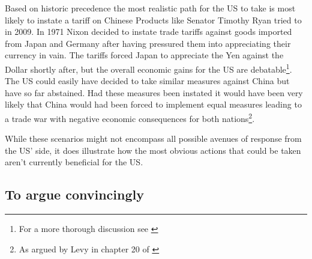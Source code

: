 Based on historic precedence the most realistic path for the US to take 
is most likely to instate a tariff on Chinese Products like Senator 
Timothy Ryan tried to in 2009. In 1971 Nixon decided to instate trade 
tariffs against goods imported from Japan and Germany after having 
pressured them into appreciating their currency in vain. The tariffs 
forced Japan to appreciate the Yen against the Dollar shortly after, but 
the overall economic gains for the US are debatable\footnote{For a more 
thorough discussion see \cite{kuroda2004}}. The US could easily have 
decided to take similar measures against China but have so far 
abstained. Had these measures been instated it would have been very 
likely that China would had been forced to implement equal measures 
leading to a trade war with negative economic consequences for both 
nations\footnote{As argued by Levy in chapter 20 of \cite{Evenett10}}.

While these scenarios might not encompass all possible avenues of 
response from the US' side, it does illustrate how the most obvious 
actions that could be taken aren't currently beneficial for the US.


\subsection{To argue convincingly}



